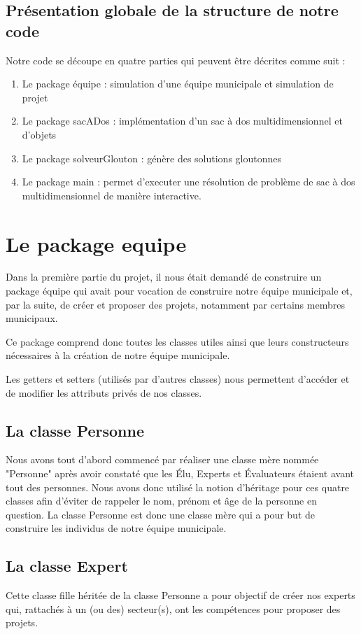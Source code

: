 \documentclass[11pt]{article}
\begin{document}
\subsection{Présentation globale de la structure de notre code}
Notre code se découpe en quatre parties qui peuvent être décrites comme suit : 
\begin{enumerate}
	\item Le package équipe : simulation d’une équipe municipale et simulation de projet
	\item Le package sacADos : implémentation d'un sac à dos multidimensionnel et d'objets
	\item Le package solveurGlouton : génère des solutions gloutonnes 
	\item Le package main : permet d'executer une résolution de problème de sac à dos multidimensionnel de manière interactive. 
\end{enumerate}

\section{Le package equipe }
Dans la première partie du projet, il nous était demandé de construire un package équipe qui avait pour vocation de construire notre équipe municipale et, par la suite, de créer et proposer des projets, notamment par certains membres municipaux. 

Ce package comprend donc toutes les classes utiles ainsi que leurs constructeurs nécessaires à la création de notre équipe municipale. 

Les getters et setters (utilisés par d’autres classes) nous permettent d’accéder et de modifier les attributs privés de nos classes. 

\subsection{La classe Personne}
Nous avons tout d’abord commencé par réaliser une classe mère nommée "Personne" après avoir constaté que les Élu, Experts et Évaluateurs étaient avant tout des personnes. Nous avons donc utilisé la notion d’héritage pour ces quatre classes afin d’éviter de rappeler le nom, prénom et âge de la personne en question. La classe Personne est donc une classe mère qui a pour but de construire les individus de notre équipe municipale.

\subsection{La classe Expert}
Cette classe fille héritée de la classe Personne a pour objectif de créer nos experts qui, rattachés à un (ou des) secteur(s), ont les compétences pour proposer des projets. 
\end{document}
